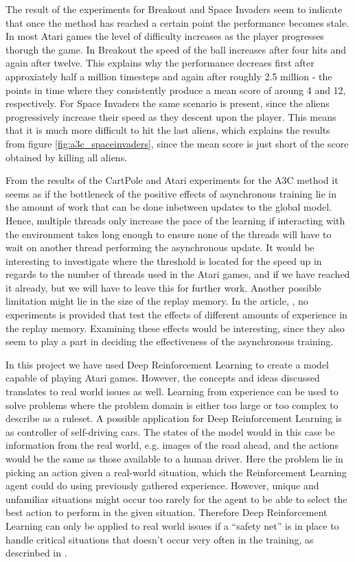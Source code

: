 \documentclass[11pt]{article}
\begin{document}
The result of the experiments for Breakout and Space Invaders
seem to indicate that once the method has reached a certain point
the performance becomes stale.
In most Atari games the level of difficulty increases as the
player progresses thorugh the game.
In Breakout the speed of the ball increases after
four hits and again after twelve.
This explains why the performance decreaes first after
approxiately half a million timesteps and again after
roughly 2.5 million - the points in time where they
consistently produce a mean score of aroung 4 and 12,
respectively.
For Space Invaders the same scenario is present, since
the aliens progressively increase their speed as they
descent upon the player.
This means that it is much more difficult to hit the last aliens,
which explains the results from figure \ref{fig:a3c_spaceinvaders},
since the mean score is just short of the score obtained by killing all aliens.

From the results of the CartPole and Atari experiments for the A3C method
it seems as if the bottleneck of the positive effects of asynchronous training
lie in the amount of work that can be done inbetween updates to the global model.
Hence, multiple threads only increase the pace of the learning if
interacting with the environment takes long enough to ensure
none of the threads will have to wait on another thread performing
the asynchronous update.
It would be interesting to investigate where the threshold is located
for the speed up in regards to the number of threads used in the Atari games,
and if we have reached it already, but we will have to leave this for further work.
Another possible limitation might lie in the size of the replay memory.
In the article, \cite{a3c}, no experiments is provided that test
the effects of different amounts of experience in the replay memory.
Examining these effects would be interesting, since they also seem to
play a part in deciding the effectiveness of the asynchronous training.

In this project we have used Deep Reinforcement Learning to
create a model capable of playing Atari games.
However, the concepts and ideas discussed translates to real world
issues as well.
Learning from experience can be used to solve problems where the
problem domain is either too large or too complex to
describe as a ruleset.
A possible application for Deep Reinforcement Learning is
as controller of self-driving cars.
The states of the model would in this case be information
from the real world, e.g. images of the road ahead, 
and the actions would be the same as those available to
a human driver.
Here the problem lie in picking an action given a real-world situation,
which the Reinforcement Learning agent could do using previously
gathered experience.
However, unique and unfamiliar situations might occur too rarely
for the agent to be able to select the best action to perform
in the given situation.
Therefore Deep Reinforcement Learning can only be applied
to real world issues if a “safety net” is in place
to handle critical situations that doesn't occur
very often in the training, as descrinbed in \cite{BILER}.
\end{document}
